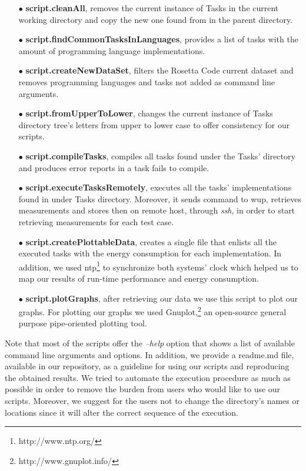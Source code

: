 \begin{enumerate}
	\item [$\bullet$] \textbf{script.cleanAll}, removes the current instance 
	of Tasks in the current working directory and copy the new one found 
	from in the parent directory. 
	\item [$\bullet$] \textbf{script.findCommonTasksInLanguages}, provides 
	a list of tasks with the amount of programming language implementations.
	\item [$\bullet$] \textbf{script.createNewDataSet}, filters the Rosetta 
	Code current dataset and removes programming languages and tasks not 
	added as command line arguments.
	\item [$\bullet$] \textbf{script.fromUpperToLower}, changes the current 
	instance of Tasks directory tree's letters from upper to lower 
	case to offer consistency for our scripts. 
	\item [$\bullet$] \textbf{script.compileTasks}, compiles all tasks found 
	under the Tasks' directory and produces error reports in a task fails to 
	compile.
	\item [$\bullet$] \textbf{script.executeTasksRemotely}, executes all the tasks' 
	implementations found in under Tasks directory. 
	Moreover, it sends command to {\sc wup}, retrieves measurements and stores 
	then on remote host, through \textit{ssh}, in order to start retrieving 
	measurements for each test case. 
	\item [$\bullet$] \textbf{script.createPlottableData}, creates a single file 
	that enlists all the executed tasks with the energy consumption for each 
	implementation. In addition, we used {\sc ntp}\footnote{http://www.ntp.org/} to 
	synchronize both systems' clock which helped us to map our results of 
	run-time performance and energy consumption. 
	\item [$\bullet$] \textbf{script.plotGraphs}, after retrieving our data 
	we use this script to plot our graphs. 
	For plotting our graphs we used Gnuplot,\footnote{http://www.gnuplot.info/} 
	an open-source general purpose pipe-oriented plotting tool.
\end{enumerate}

Note that most of the scripts offer the \textit{--help} option 
that shows a list of available command line arguments and options.
In addition, we provide a {\sc readme.md} file, available in our 
repository, as a guideline for using our scripts and reproducing 
the obtained results. 
We tried to automate the execution procedure as much as possible 
in order to remove the burden from users who would like to use 
our scripts.
Moreover, we suggest for the users not to change the directory's names or 
locations since it will alter the correct sequence of the 
execution. 


